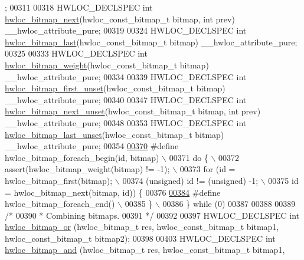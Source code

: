 \begin{DoxyCode}
      ;
00311 
00318 HWLOC\_DECLSPEC \textcolor{keywordtype}{int} \hyperlink{a00205_gaab7240b4b644693b775dad17b44ffd68}{hwloc\_bitmap\_next}(hwloc\_const\_bitmap\_t bitmap, \textcolor{keywordtype}{int} prev) 
      \_\_hwloc\_attribute\_pure;
00319 
00324 HWLOC\_DECLSPEC \textcolor{keywordtype}{int} \hyperlink{a00205_ga3d9b08b060a59bbab5a4ea6d0a1ed7a6}{hwloc\_bitmap\_last}(hwloc\_const\_bitmap\_t bitmap) \_\_hwloc\_attribute\_pure;
00325 
00333 HWLOC\_DECLSPEC \textcolor{keywordtype}{int} \hyperlink{a00205_ga0200466842c0e1f5da75e84dde460b10}{hwloc\_bitmap\_weight}(hwloc\_const\_bitmap\_t bitmap) 
      \_\_hwloc\_attribute\_pure;
00334 
00339 HWLOC\_DECLSPEC \textcolor{keywordtype}{int} \hyperlink{a00205_gae408841487b288e148a478ba0465c99e}{hwloc\_bitmap\_first\_unset}(hwloc\_const\_bitmap\_t bitmap) 
      \_\_hwloc\_attribute\_pure;
00340 
00347 HWLOC\_DECLSPEC \textcolor{keywordtype}{int} \hyperlink{a00205_ga9653af34d1460ef106b7df25af4cdca8}{hwloc\_bitmap\_next\_unset}(hwloc\_const\_bitmap\_t bitmap, \textcolor{keywordtype}{int} prev) 
      \_\_hwloc\_attribute\_pure;
00348 
00353 HWLOC\_DECLSPEC \textcolor{keywordtype}{int} \hyperlink{a00205_ga45d49aeb45c7da631b1480a93dc3fc92}{hwloc\_bitmap\_last\_unset}(hwloc\_const\_bitmap\_t bitmap) 
      \_\_hwloc\_attribute\_pure;
00354 
\hyperlink{a00205_ga3f6861045a8029ade373510ffa727d2a}{00370} \textcolor{preprocessor}{#define hwloc\_bitmap\_foreach\_begin(id, bitmap) \(\backslash\)}
00371 \textcolor{preprocessor}{do \{ \(\backslash\)}
00372 \textcolor{preprocessor}{        assert(hwloc\_bitmap\_weight(bitmap) != -1); \(\backslash\)}
00373 \textcolor{preprocessor}{        for (id = hwloc\_bitmap\_first(bitmap); \(\backslash\)}
00374 \textcolor{preprocessor}{             (unsigned) id != (unsigned) -1; \(\backslash\)}
00375 \textcolor{preprocessor}{             id = hwloc\_bitmap\_next(bitmap, id)) \{}
00376 
\hyperlink{a00205_gafcf3246db406218d4e155735b3fa6528}{00384} \textcolor{preprocessor}{#define hwloc\_bitmap\_foreach\_end()              \(\backslash\)}
00385 \textcolor{preprocessor}{        \} \(\backslash\)}
00386 \textcolor{preprocessor}{\} while (0)}
00387 
00388 
00389 \textcolor{comment}{/*}
00390 \textcolor{comment}{ * Combining bitmaps.}
00391 \textcolor{comment}{ */}
00392 
00397 HWLOC\_DECLSPEC \textcolor{keywordtype}{int} \hyperlink{a00205_ga120b8aefb9ce7ef349929656359b1859}{hwloc\_bitmap\_or} (hwloc\_bitmap\_t res, hwloc\_const\_bitmap\_t bitmap1, 
      hwloc\_const\_bitmap\_t bitmap2);
00398 
00403 HWLOC\_DECLSPEC \textcolor{keywordtype}{int} \hyperlink{a00205_ga674533016ffed922a28b4f0b49b82cd4}{hwloc\_bitmap\_and} (hwloc\_bitmap\_t res, hwloc\_const\_bitmap\_t bitmap1, 

\end{DoxyCode}
